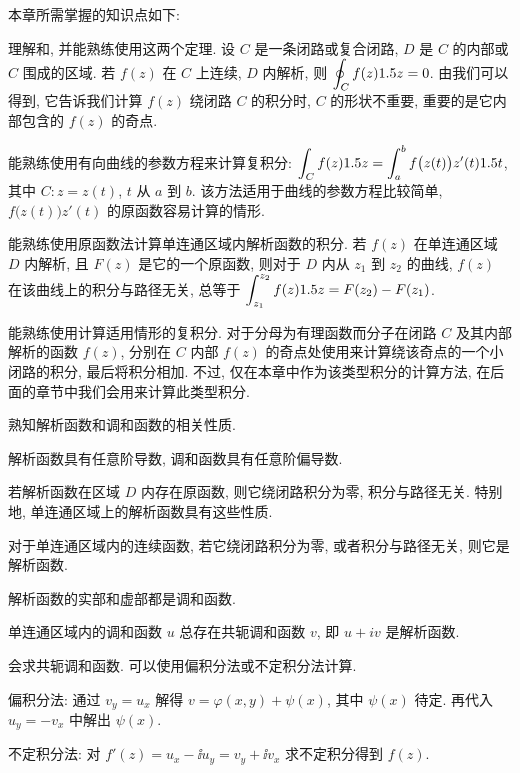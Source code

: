 
本章所需掌握的知识点如下:
\begin{conclusion}
  \item 理解\thmCG 和\thmCCC, 并能熟练使用这两个定理.
  设 $C$ 是一条闭路或复合闭路, $D$ 是 $C$ 的内部或 $C$ 围成的区域.
  若 $f(z)$ 在 $C$ 上连续, $D$ 内解析, 则 $\displaystyle\oint_C f(z)1.5 z=0$.
  由\thmCCC 我们可以得到\thmCT, 它告诉我们计算 $f(z)$ 绕闭路 $C$ 的积分时, $C$ 的形状不重要, 重要的是它内部包含的 $f(z)$ 的奇点.
  \item 能熟练使用有向曲线的参数方程来计算复积分: $\displaystyle\int_C f(z)1.5 z=\int_a^bf\bigl(z(t)\bigr)z'(t)1.5 t$, 其中 $C:z=z(t)$, $t$ 从 $a$ 到 $b$.
  该方法适用于曲线的参数方程比较简单, $f\bigl(z(t)\bigr)z'(t)$ 的原函数容易计算的情形.
  \item 能熟练使用原函数法计算单连通区域内解析函数的积分.
  若 $f(z)$ 在单连通区域 $D$ 内解析, 且 $F(z)$ 是它的一个原函数, 则对于 $D$ 内从 $z_1$ 到 $z_2$ 的曲线, $f(z)$ 在该曲线上的积分与路径无关, 总等于 $\displaystyle\int_{z_1}^{z_2}f(z)1.5 z=F(z_2)-F(z_1)$.
  \item 能熟练使用\thmCIH 计算适用情形的复积分. 对于分母为有理函数而分子在闭路 $C$ 及其内部解析的函数 $f(z)$, 分别在 $C$ 内部 $f(z)$ 的奇点处使用\thmCIH 来计算绕该奇点的一个小闭路的积分, 最后将积分相加.
  不过, \thmCIH 仅在本章中作为该类型积分的计算方法, 在后面的章节中我们会用\thmRes 来计算此类型积分.
  \item 熟知解析函数和调和函数的相关性质.
  \begin{conclusion}
    \item 解析函数具有任意阶导数, 调和函数具有任意阶偏导数.
    \item 若解析函数在区域 $D$ 内存在原函数, 则它绕闭路积分为零, 积分与路径无关. 特别地, 单连通区域上的解析函数具有这些性质.
    \item 对于单连通区域内的连续函数, 若它绕闭路积分为零, 或者积分与路径无关, 则它是解析函数.
    \item 解析函数的实部和虚部都是调和函数.
    \item 单连通区域内的调和函数 $u$ 总存在共轭调和函数 $v$, 即 $u+iv$ 是解析函数.
  \end{conclusion}
  \item 会求共轭调和函数. 可以使用偏积分法或不定积分法计算.
  \begin{conclusion}
    \item 偏积分法: 通过 $v_y=u_x$ 解得 $v=\varphi(x,y)+\psi(x)$, 其中 $\psi(x)$ 待定. 再代入 $u_y=-v_x$ 中解出 $\psi(x)$.
    \item 不定积分法: 对 $f'(z)=u_x-\ii u_y=v_y+\ii v_x$ 求不定积分得到 $f(z)$.
  \end{conclusion}
\end{conclusion}

